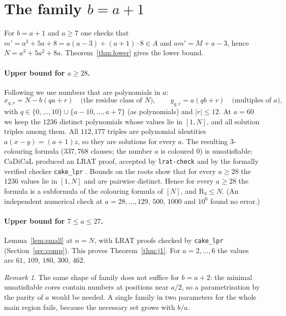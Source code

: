 \documentclass[11pt,a4paper]{article}
\theoremstyle{definition}
\theoremstyle{remark}
\newtheorem{remark}[theorem]{Remark}
\newcommand{\R}{\mathrm{R}}
\begin{document}
\section{The family \texorpdfstring{$b=a+1$}{b=a+1}}\label{sec:j1}
For $b=a+1$ and $a\ge7$ one checks that $m'=a^2+5a+8=a(a-3)+(a+1)\cdot8\in A$ and $am'=M+a-3$, hence $N=a^3+5a^2+8a$. Theorem~\ref{thm:lower} gives the lower bound.

\paragraph{Upper bound for $a\ge28$.} Following \cite[Lemma~4.5]{CDW22} we use numbers that are polynomials in $a$:
\[
  x_{q,r}=N-b(qa+r)\quad\text{(the residue class of $N$)},\qquad
  y_{q,r}=a(qb+r)\quad\text{(multiples of $a$)},
\]
with $q\in\{0,\dots,10\}\cup\{a-10,\dots,a+7\}$ (as polynomials) and $|r|\le12$. At $a=60$ we keep the $1236$ distinct polynomials whose values lie in $[1,N]$, and all solution triples among them. All $112{,}177$ triples are polynomial identities $a(x-y)=(a+1)z$, so they are solutions for every $a$. The resulting $3$-colouring formula ($337{,}768$ clauses; the number $a$ is coloured $0$) is unsatisfiable: CaDiCaL produced an LRAT proof, accepted by \texttt{lrat-check} and by the formally verified checker \texttt{cake\_lpr} \cite{THM21}. Bounds on the roots show that for every $a\ge28$ the $1236$ values lie in $[1,N]$ and are pairwise distinct. Hence for every $a\ge28$ the formula is a subformula of the colouring formula of $[N]$, and $\R_3\le N$. (An independent numerical check at $a=28,\dots,129$, $500$, $1000$ and $10^6$ found no error.)

\paragraph{Upper bound for $7\le a\le27$.} Lemma~\ref{lem:small} at $n=N$, with LRAT proofs checked by \texttt{cake\_lpr} (Section~\ref{sec:comp}). This proves Theorem~\ref{thm:j1}. For $a=2,\dots,6$ the values are $61$, $109$, $180$, $300$, $462$.

\begin{remark}
The same shape of family does not suffice for $b=a+2$: the minimal unsatisfiable cores contain numbers at positions near $a/2$, so a parametrisation by the parity of $a$ would be needed. A single family in two parameters for the whole main region fails, because the necessary set grows with $b/a$.
\end{remark}
\end{document}
